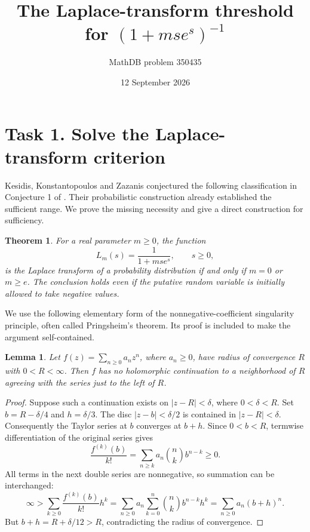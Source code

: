 \documentclass[11pt]{article}
\title{The Laplace-transform threshold for \texorpdfstring{$(1+mse^s)^{-1}$}{(1+m s exp(s)) inverse}}
\author{MathDB problem 350435}
\date{12 September 2026}
\newtheorem{theorem}{Theorem}
\newtheorem{lemma}{Lemma}
\begin{document}
\maketitle

\section*{Task 1. Solve the Laplace-transform criterion}

Kesidis, Konstantopoulos and Zazanis conjectured the following classification
in Conjecture 1 of \cite[p.~18]{KKZ}. Their probabilistic construction already
established the sufficient range. We prove the missing necessity and give
a direct construction for sufficiency.

\begin{theorem}
For a real parameter $m\geq0$, the function
\[
 L_m(s)=\frac{1}{1+mse^s},\qquad s\geq0,
\]
is the Laplace transform of a probability distribution if and only if
$m=0$ or $m\geq e$. The conclusion holds even if the putative random
variable is initially allowed to take negative values.
\end{theorem}

We use the following elementary form of the nonnegative-coefficient
singularity principle, often called Pringsheim's theorem. Its proof
is included to make the argument self-contained.

\begin{lemma}\label{lem:pringsheim}
Let $f(z)=\sum_{n\geq0}a_nz^n$, where $a_n\geq0$, have radius of
convergence $R$ with $0<R<\infty$. Then $f$ has no holomorphic
continuation to a neighborhood of $R$ agreeing with the series just
to the left of $R$.
\end{lemma}
\begin{proof}
Suppose such a continuation exists on $|z-R|<\delta$, where
$0<\delta<R$. Set $b=R-\delta/4$ and $h=\delta/3$.
The disc $|z-b|<\delta/2$ is contained in $|z-R|<\delta$.
Consequently the Taylor series at $b$ converges at $b+h$.
Since $0<b<R$, termwise differentiation of the original series gives
\[
 \frac{f^{(k)}(b)}{k!}
   =\sum_{n\geq k}a_n\binom{n}{k}b^{n-k}\geq0.
\]
All terms in the next double series are nonnegative, so summation
can be interchanged:
\[
 \infty>
 \sum_{k\geq0}\frac{f^{(k)}(b)}{k!}h^k
 =\sum_{n\geq0}a_n\sum_{k=0}^n\binom{n}{k}b^{n-k}h^k
 =\sum_{n\geq0}a_n(b+h)^n .
\]
But $b+h=R+\delta/12>R$, contradicting the radius of convergence.
\end{proof}
\end{document}
